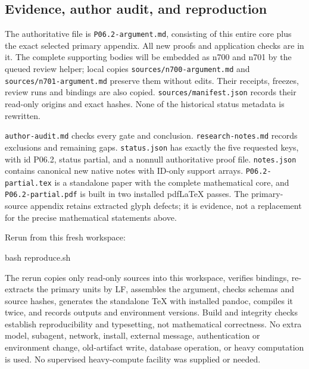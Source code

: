\documentclass[
  11pt,
]{article}
\newenvironment{Shaded}{}{}
\newcommand{\FunctionTok}[1]{\textcolor[rgb]{0.02,0.16,0.49}{#1}}
\newcommand{\NormalTok}[1]{#1}
\begin{document}
\subsection{Evidence, author audit, and
reproduction}\label{evidence-author-audit-and-reproduction}

The authoritative file is \texttt{P06.2-argument.md}, consisting of this
entire core plus the exact selected primary appendix. All new proofs and
application checks are in it. The complete supporting bodies will be
embedded as n700 and n701 by the queued review helper; local copies
\texttt{sources/n700-argument.md} and \texttt{sources/n701-argument.md}
preserve them without edits. Their receipts, freezes, review runs and
bindings are also copied. \texttt{sources/manifest.json} records their
read-only origins and exact hashes. None of the historical status
metadata is rewritten.

\texttt{author-audit.md} checks every gate and conclusion.
\texttt{research-notes.md} records exclusions and remaining gaps.
\texttt{status.json} has exactly the five requested keys, with id P06.2,
status partial, and a nonnull authoritative proof file.
\texttt{notes.json} contains canonical new native notes with ID-only
support arrays. \texttt{P06.2-partial.tex} is a standalone paper with
the complete mathematical core, and \texttt{P06.2-partial.pdf} is built
in two installed pdfLaTeX passes. The primary-source appendix retains
extracted glyph defects; it is evidence, not a replacement for the
precise mathematical statements above.

Rerun from this fresh workspace:

\begin{Shaded}
\begin{Highlighting}[]
\FunctionTok{bash}\NormalTok{ reproduce.sh}
\end{Highlighting}
\end{Shaded}

The rerun copies only read-only sources into this workspace, verifies
bindings, re-extracts the primary units by LF, assembles the argument,
checks schemas and source hashes, generates the standalone TeX with
installed pandoc, compiles it twice, and records outputs and environment
versions. Build and integrity checks establish reproducibility and
typesetting, not mathematical correctness. No extra model, subagent,
network, install, external message, authentication or environment
change, old-artifact write, database operation, or heavy computation is
used. No supervised heavy-compute facility was supplied or needed.
\end{document}
